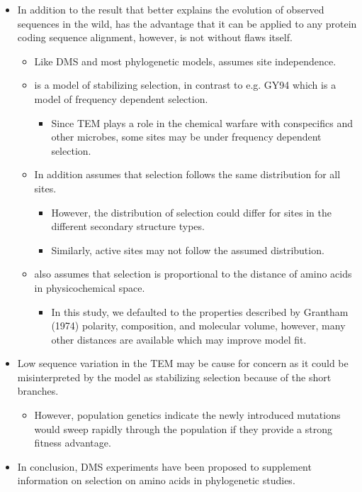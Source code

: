 \documentclass[12pt]{article}
\begin{document}
\begin{itemize}
	\item In addition to the result that \selac better explains the evolution of observed sequences in the wild, \selac has the advantage that it can be applied to any protein coding sequence alignment, however, is not without flaws itself.
	\begin{itemize}
		\item Like DMS and most phylogenetic models, \selac assumes site independence.
		\item \selac is a model of stabilizing selection, in contrast to e.g. GY94 which is a model of frequency dependent selection.
		\begin{itemize}
			\item Since TEM plays a role in the chemical warfare with conspecifics and other microbes, some sites may be under frequency dependent selection.
		\end{itemize}
		\item In addition \selac assumes that selection follows the same distribution for all sites.
		\begin{itemize}
			\item However, the distribution of selection could differ for sites in the different secondary structure types.
			\item Similarly, active sites may not follow the assumed distribution.
		\end{itemize}
		\item \selac also assumes that selection is proportional to the distance of amino acids in physicochemical space. 
		\begin{itemize}
			\item In this study, we defaulted to the properties described by Grantham (1974) polarity, composition, and molecular volume, however, many other distances are available which may improve model fit.
		\end{itemize}
	\end{itemize}
	\item Low sequence variation in the TEM may be cause for concern as it could be misinterpreted by the model as stabilizing selection because of the short branches.
	\begin{itemize}
		\item However, population genetics indicate the newly introduced mutations would sweep rapidly through the population if they provide a strong fitness advantage.
	\end{itemize}
	\item In conclusion, DMS experiments have been proposed to supplement information on selection on amino acids in phylogenetic studies.

\end{itemize}
\end{document}
